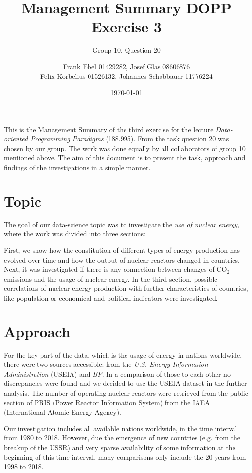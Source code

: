 \documentclass[a4paper,10pt,twocolumn]{scrartcl}
\author{Frank Ebel 01429282, Josef Glas 08606876\\Felix Korbelius 01526132, Johannes Schabbauer 11776224}
\title{\vspace*{-1cm}Management Summary DOPP Exercise 3}
\subtitle{Group 10, Question 20}
\date{\today \vspace*{-0.8cm}}
\begin{document}
\sffamily
\maketitle

This is the Management Summary of the third exercise for the lecture \emph{Data-oriented Programming Paradigms} (188.995).  From the task question 20 was chosen by our group. The work was done equally by all collaborators of group 10 mentioned above. The aim of this document is to present the task, approach and findings of the investigations in a simple manner.

\section{Topic}

The goal of our data-science topic was to investigate the \emph{use of nuclear energy}, where the work was divided into three sections:

First, we show how the constitution of different types of energy production has evolved over time and how the output of nuclear reactors changed in countries. Next, it was investigated if there is any connection between changes of CO$_2$ emissions and the usage of nuclear energy. In the third section, possible correlations of nuclear energy production with further characteristics of countries, like population or economical and political indicators were investigated.

\section{Approach}

For the key part of the data, which is the usage of energy in nations worldwide, there were two sources accessible: from the \emph{U.S. Energy Information Administration} (USEIA) and \emph{BP}. In a comparison of those to each other no discrepancies were found and we decided to use the USEIA dataset in the further analysis. 
The number of operating nuclear reactors were retrieved from the public section of PRIS (Power Reactor Information System) from the IAEA (International Atomic Energy Agency).

Our investigation includes all available nations worldwide, in the time interval from 1980 to 2018. However, due the emergence of new countries (e.g. from the breakup of the USSR) and very sparse availability of some information at the beginning of this time interval, many comparisons only include the 20 years from 1998 to 2018. 
\end{document}

